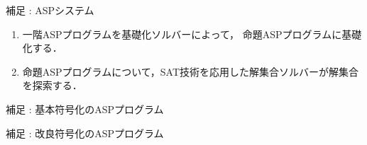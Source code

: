 \begin{frame}{補足 : ASPシステム}
 
 \vspace{-0.5cm}

 \begin{figure}[htbp]
  \centering
  
 \end{figure}

 \vspace{-0.5cm}

 \begin{exampleblock}{}
  \begin{enumerate}
   \item 一階ASPプログラムを基礎化ソルバーによって，
		 命題ASPプログラムに\alert{基礎化}する．
   \item 命題ASPプログラムについて，SAT技術を応用した解集合ソルバーが解集合を探索する．
  \end{enumerate}
 \end{exampleblock}

\end{frame}


\begin{frame}[fragile]{補足 : 基本符号化のASPプログラム}
 \begin{exampleblock}{}
  \begin{center}
   
  \end{center}
 \end{exampleblock}
\end{frame}

\begin{frame}[fragile]{補足 : 改良符号化のASPプログラム}

 \begin{exampleblock}{}
  \begin{center}
   
  \end{center}
 \end{exampleblock}

\end{frame}

\backupend
